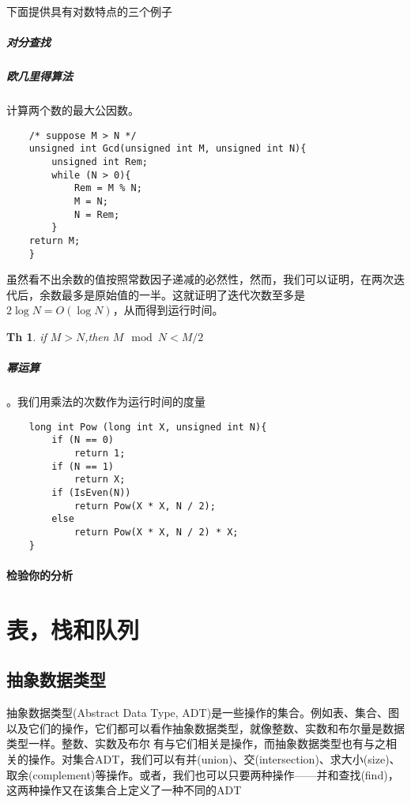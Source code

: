\documentclass[utf8]{ctexbook}
\newtheorem{Theorem}{\large\textbf Th}[chapter]
\begin{document}
    {\heiti 下面提供具有对数特点的三个例子}
\paragraph{对分查找}
\paragraph{欧几里得算法} 计算两个数的最大公因数。

\begin{lstlisting}
    /* suppose M > N */
    unsigned int Gcd(unsigned int M, unsigned int N){ 
        unsigned int Rem;
        while (N > 0){
            Rem = M % N;
            M = N; 
            N = Rem;
        }
    return M;
    }
\end{lstlisting}

虽然看不出余数的值按照常数因子递减的必然性，然而，我们可以证明，在两次迭代后，余数最多是原始值的一半。这就证明了迭代次数至多是$2\log N = O(\log N)$，从而得到运行时间。

\begin{Theorem}
    if $M>N$,then $M\mod N < M/2$
\end{Theorem}

\paragraph{幂运算}。我们用乘法的次数作为运行时间的度量
\begin{lstlisting}
    long int Pow (long int X, unsigned int N){
        if (N == 0)
            return 1;
        if (N == 1)
            return X;
        if (IsEven(N))
            return Pow(X * X, N / 2);
        else 
            return Pow(X * X, N / 2) * X;
    }
\end{lstlisting}

\subsubsection{检验你的分析}

\chapter{表，栈和队列}
\section{抽象数据类型}
{\kaishu 抽象数据类型(Abstract Data Type, ADT)}是一些操作的集合。例如表、集合、图以及它们的操作，它们都可以看作抽象数据类型，就像整数、实数和布尔量是数据类型一样。整数、实数及布尔𨤥有与它们相关是操作，而抽象数据类型也有与之相关的操作。对集合ADT，我们可以有{\kaishu 并(union)、交(intersection)、求大小(size)、取余(complement)}等操作。或者，我们也可以只要两种操作——{\kaishu 并和查找(find)}，这两种操作又在该集合上定义了一种{\kaishu 不同的}ADT
\end{document}
